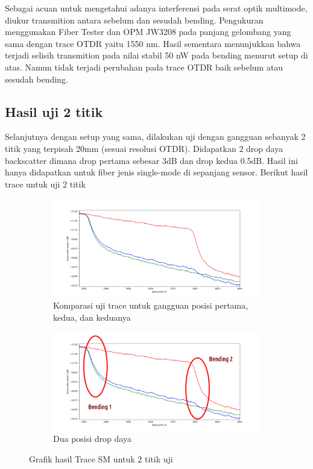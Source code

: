 \documentclass[12pt]{article}
\begin{document}
\begin{enumerate}
		Sebagai acuan untuk mengetahui adanya interferensi pada serat optik multimode, diukur transmition antara sebelum dan sesudah bending. 
		Pengukuran menggunakan Fiber Tester dan OPM JW3208 pada panjang gelombang yang sama dengan trace OTDR yaitu 1550 nm.
		Hasil sementara menunjukkan bahwa terjadi selisih transmition pada nilai stabil 50 nW pada bending menurut setup di atas.
		Namun tidak terjadi perubahan pada trace OTDR baik sebelum atau sesudah bending. 
	
	\end{enumerate}

	\subsection{Hasil uji 2 titik}
	
	Selanjutnya dengan setup yang sama, dilakukan uji dengan gangguan sebanyak 2 titik yang terpisah 20mm (sesuai resolusi OTDR).
	Didapatkan 2 drop daya backscatter dimana drop pertama sebesar 3dB dan drop kedua 0.5dB.
	Hasil ini hanya didapatkan untuk fiber jenis single-mode di sepanjang sensor.
	Berikut hasil trace untuk uji 2 titik
	
	\begin{figure}[!h]
		\centering
		\captionsetup{justification=centering}
		\begin{subfigure}[h]{\textwidth}
			\includegraphics[width=\textwidth]{images/Bab_4/smsm}	
			\caption{\small{Komparasi uji trace untuk gangguan posisi pertama, kedua, dan keduanya}}		
		\end{subfigure}
		\begin{subfigure}[h]{0.8\textwidth}
			\includegraphics[width=\linewidth]{images/Bab_4/smsm2}
			\caption{\small{Dua posisi drop daya}}			
		\end{subfigure}
		\caption[Uji Pagar]{\small{Grafik hasil Trace SM untuk 2 titik uji}}
	\end{figure}
\end{document}

